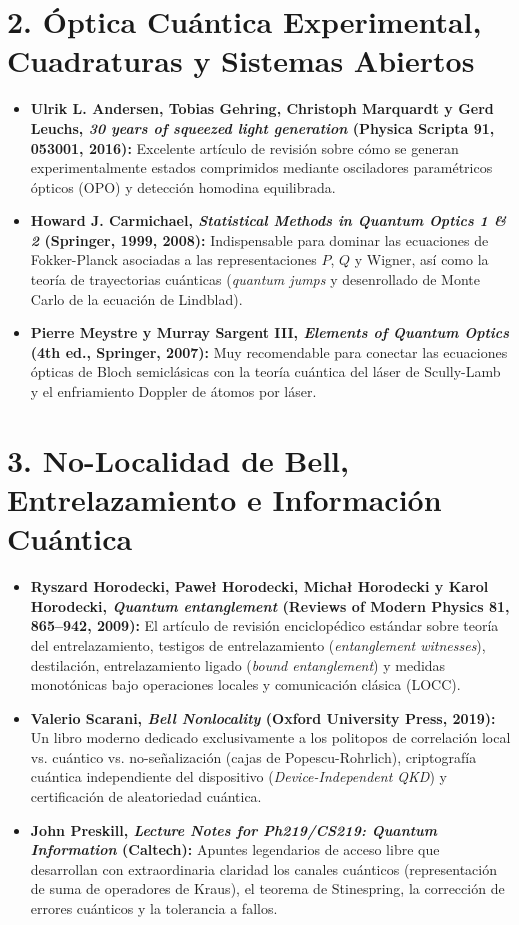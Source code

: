 \documentclass[11pt,a4paper]{book}
\begin{document}
\section*{2. Óptica Cuántica Experimental, Cuadraturas y Sistemas Abiertos}
\begin{itemize}
    \item \textbf{Ulrik L. Andersen, Tobias Gehring, Christoph Marquardt y Gerd Leuchs, \textit{30 years of squeezed light generation} (Physica Scripta 91, 053001, 2016):} Excelente artículo de revisión sobre cómo se generan experimentalmente estados comprimidos mediante osciladores paramétricos ópticos (OPO) y detección homodina equilibrada.
    \item \textbf{Howard J. Carmichael, \textit{Statistical Methods in Quantum Optics 1 \& 2} (Springer, 1999, 2008):} Indispensable para dominar las ecuaciones de Fokker-Planck asociadas a las representaciones $P$, $Q$ y Wigner, así como la teoría de trayectorias cuánticas (\textit{quantum jumps} y desenrollado de Monte Carlo de la ecuación de Lindblad).
    \item \textbf{Pierre Meystre y Murray Sargent III, \textit{Elements of Quantum Optics} (4th ed., Springer, 2007):} Muy recomendable para conectar las ecuaciones ópticas de Bloch semiclásicas con la teoría cuántica del láser de Scully-Lamb y el enfriamiento Doppler de átomos por láser.
\end{itemize}

\section*{3. No-Localidad de Bell, Entrelazamiento e Información Cuántica}
\begin{itemize}
    \item \textbf{Ryszard Horodecki, Paweł Horodecki, Michał Horodecki y Karol Horodecki, \textit{Quantum entanglement} (Reviews of Modern Physics 81, 865--942, 2009):} El artículo de revisión enciclopédico estándar sobre teoría del entrelazamiento, testigos de entrelazamiento (\textit{entanglement witnesses}), destilación, entrelazamiento ligado (\textit{bound entanglement}) y medidas monotónicas bajo operaciones locales y comunicación clásica (LOCC).
    \item \textbf{Valerio Scarani, \textit{Bell Nonlocality} (Oxford University Press, 2019):} Un libro moderno dedicado exclusivamente a los politopos de correlación local vs. cuántico vs. no-señalización (cajas de Popescu-Rohrlich), criptografía cuántica independiente del dispositivo (\textit{Device-Independent QKD}) y certificación de aleatoriedad cuántica.
    \item \textbf{John Preskill, \textit{Lecture Notes for Ph219/CS219: Quantum Information} (Caltech):} Apuntes legendarios de acceso libre que desarrollan con extraordinaria claridad los canales cuánticos (representación de suma de operadores de Kraus), el teorema de Stinespring, la corrección de errores cuánticos y la tolerancia a fallos.
\end{itemize}
\end{document}
